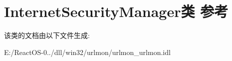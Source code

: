 \hypertarget{class_internet_security_manager}{}\section{Internet\+Security\+Manager类 参考}
\label{class_internet_security_manager}


该类的文档由以下文件生成\+:\begin{DoxyCompactItemize}
\item 
E\+:/\+React\+O\+S-\/0../dll/win32/urlmon/urlmon\+\_\+urlmon.\+idl\end{DoxyCompactItemize}
